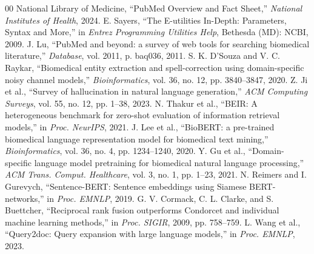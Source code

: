 \documentclass[conference]{IEEEtran}
\begin{document}
\begin{thebibliography}{00}
 National Library of Medicine, ``PubMed Overview and Fact Sheet,'' \textit{National Institutes of Health}, 2024.
 E. Sayers, ``The E-utilities In-Depth: Parameters, Syntax and More,'' in \textit{Entrez Programming Utilities Help}, Bethesda (MD): NCBI, 2009.
 J. Lu, ``PubMed and beyond: a survey of web tools for searching biomedical literature,'' \textit{Database}, vol. 2011, p. baq036, 2011.
 S. K. D'Souza and V. C. Raykar, ``Biomedical entity extraction and spell-correction using domain-specific noisy channel models,'' \textit{Bioinformatics}, vol. 36, no. 12, pp. 3840--3847, 2020.
 Z. Ji et al., ``Survey of hallucination in natural language generation,'' \textit{ACM Computing Surveys}, vol. 55, no. 12, pp. 1--38, 2023.
 N. Thakur et al., ``BEIR: A heterogeneous benchmark for zero-shot evaluation of information retrieval models,'' in \textit{Proc. NeurIPS}, 2021.
 J. Lee et al., ``BioBERT: a pre-trained biomedical language representation model for biomedical text mining,'' \textit{Bioinformatics}, vol. 36, no. 4, pp. 1234--1240, 2020.
 Y. Gu et al., ``Domain-specific language model pretraining for biomedical natural language processing,'' \textit{ACM Trans. Comput. Healthcare}, vol. 3, no. 1, pp. 1--23, 2021.
 N. Reimers and I. Gurevych, ``Sentence-BERT: Sentence embeddings using Siamese BERT-networks,'' in \textit{Proc. EMNLP}, 2019.
 G. V. Cormack, C. L. Clarke, and S. Buettcher, ``Reciprocal rank fusion outperforms Condorcet and individual machine learning methods,'' in \textit{Proc. SIGIR}, 2009, pp. 758--759.
 L. Wang et al., ``Query2doc: Query expansion with large language models,'' in \textit{Proc. EMNLP}, 2023.
\end{thebibliography}
\end{document}
